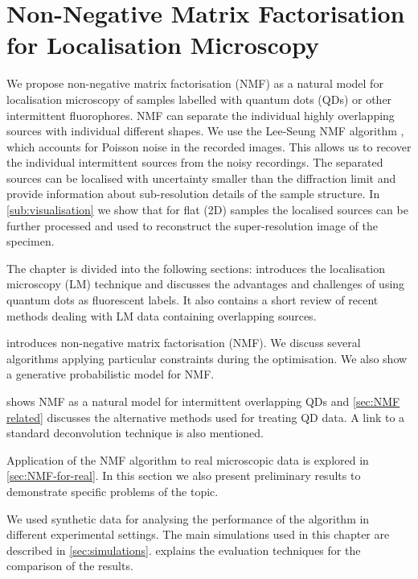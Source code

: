 \chapter{Non-Negative Matrix Factorisation for Localisation Microscopy\label{ch:NMF}}

We propose non-negative matrix factorisation (NMF) as a natural model for localisation microscopy of samples labelled with quantum dots (QDs) or other intermittent fluorophores. NMF can separate the individual highly overlapping sources with individual different shapes. We use the Lee-Seung NMF algorithm \cite{Lee2001}, which accounts for Poisson noise in the recorded images. This allows us to recover the individual intermittent sources from the noisy recordings. The separated sources can be localised with uncertainty smaller than the diffraction limit and provide information about sub-resolution details of the sample structure. In \autoref{sub:visualisation} we show that for flat (2D) samples the localised sources can be further processed and used to reconstruct the super-resolution image of the specimen.

The chapter is divided into the following sections:  introduces the localisation microscopy (LM) technique and discusses the advantages and challenges of using quantum dots as fluorescent labels. It also contains a short review of recent methods dealing with LM data containing overlapping sources. 

 introduces non-negative matrix factorisation (NMF). We discuss several algorithms applying particular constraints during the optimisation. We also show a generative probabilistic model for NMF.

 shows NMF as a natural model for intermittent overlapping QDs and \autoref{sec:NMF related} discusses the alternative methods used for treating QD data. A link to a standard deconvolution technique is also mentioned. 

Application of the NMF algorithm to real microscopic data is explored in \autoref{sec:NMF-for-real}. In this section we also present preliminary results to demonstrate specific problems of the topic.

We used synthetic data for analysing the performance of the algorithm in different experimental settings. The main simulations used in this chapter are described in \autoref{sec:simulations}.  explains the evaluation techniques for the comparison of the results.

